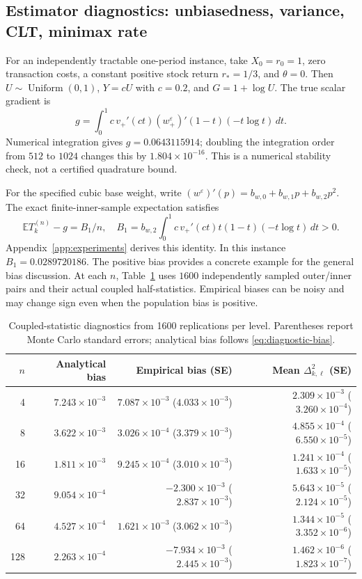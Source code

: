\documentclass[11pt]{article}
\newcommand{\E}{\mathbb E}
\newcommand{\1}{\mathbf 1}
\newcommand{\eps}{\varepsilon}
\begin{document}
\subsection{Estimator diagnostics: unbiasedness, variance, CLT, minimax rate}
For an independently tractable one-period instance, take $X_0=r_0=1$, zero transaction costs, a constant positive stock return $r_*=1/3$, and $\theta=0$. Then $U\sim\operatorname{Uniform}(0,1)$, $Y=cU$ with $c=0.2$, and $G=1+\log U$. The true scalar gradient is
\begin{equation}\label{eq:diagnostic-gradient}
 g=\int_0^1c\,v_+'(ct)(w_+^\eps)'(1-t)(-t\log t)\,dt.
\end{equation}
Numerical integration gives $g=0.0643115914$; doubling the integration order from $512$ to $1024$ changes this by $1.804\times10^{-16}$. This is a numerical stability check, not a certified quadrature bound.

For the specified cubic base weight, write $(w^\eps)'(p)=b_{w,0}+b_{w,1}p+b_{w,2}p^2$. The exact finite-inner-sample expectation satisfies
\begin{equation}\label{eq:diagnostic-bias}
 \E T_k^{(n)}-g=B_1/n,\quad
 B_1=b_{w,2}\int_0^1 c\,v_+'(ct)t(1-t)(-t\log t)\,dt>0.
\end{equation}
Appendix~\ref{app:experiments} derives this identity. In this instance $B_1=0.0289720186$. The positive bias provides a concrete example for the general bias discussion. At each $n$, Table~\ref{tab:level-diagnostics} uses $1600$ independently sampled outer/inner pairs and their actual coupled half-statistics. Empirical biases can be noisy and may change sign even when the population bias is positive.

\begin{table}[htbp]
\centering\small
\caption{Coupled-statistic diagnostics from 1600 replications per level. Parentheses report Monte Carlo standard errors; analytical bias follows \eqref{eq:diagnostic-bias}.}\label{tab:level-diagnostics}
\begin{tabular}{rrrr}
\toprule
$n$ & Analytical bias & Empirical bias (SE) & Mean $\Delta_{k,\ell}^2$ (SE)\\
\midrule
4 & $7.243\times10^{-3}$ & $7.087\times10^{-3}$ ($4.033\times10^{-3}$) & $2.309\times10^{-3}$ ($3.260\times10^{-4}$) \\
8 & $3.622\times10^{-3}$ & $3.026\times10^{-4}$ ($3.379\times10^{-3}$) & $4.855\times10^{-4}$ ($6.550\times10^{-5}$) \\
16 & $1.811\times10^{-3}$ & $9.245\times10^{-4}$ ($3.010\times10^{-3}$) & $1.241\times10^{-4}$ ($1.633\times10^{-5}$) \\
32 & $9.054\times10^{-4}$ & $-2.300\times10^{-3}$ ($2.837\times10^{-3}$) & $5.643\times10^{-5}$ ($2.124\times10^{-5}$) \\
64 & $4.527\times10^{-4}$ & $1.621\times10^{-3}$ ($3.062\times10^{-3}$) & $1.344\times10^{-5}$ ($3.352\times10^{-6}$) \\
128 & $2.263\times10^{-4}$ & $-7.934\times10^{-3}$ ($2.445\times10^{-3}$) & $1.462\times10^{-6}$ ($1.823\times10^{-7}$) \\
\bottomrule
\end{tabular}
\end{table}
\end{document}
